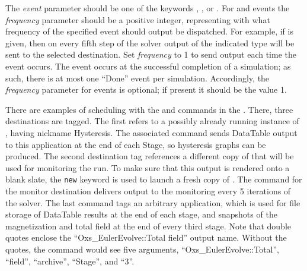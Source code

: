 \begin{description}
The \textit{event} parameter should be one of the keywords ,
, or .  For  and  events the
\textit{frequency} parameter should be a positive integer, representing
with what frequency of the specified event should output be dispatched.
For example, if  is given, then on every fifth step of the
solver output of the indicated type will be sent to the selected
destination.  Set \textit{frequency} to 1 to send output each time the
event occurs.  The  event occurs at the successful completion
of a simulation; as such, there is at most one ``Done'' event per
simulation.  Accordingly, the \textit{frequency} parameter for 
events is optional; if present it should be the value 1.

There are examples of scheduling with the  and
 commands in the .  There,
three destinations are tagged.  The first refers to a possibly already
running instance of , having nickname Hysteresis.  The
associated  command sends DataTable output to this
application at the end of each Stage, so hysteresis graphs can be
produced.  The second destination tag references a different copy of
 that will be used for monitoring the run.  To make sure
that this output is rendered onto a blank slate, the \texttt{new}
keyword is used to launch a fresh copy of .  The
 command for the monitor destination delivers output to
the monitoring  every 5 iterations of the solver.  The last
 command tags an arbitrary  application,
which is used for file storage of DataTable results at the end of each
stage, and snapshots of the magnetization and total field at the end of
every third stage.  Note that double quotes enclose the
``Oxs\_EulerEvolve::Total field'' output name.  Without the quotes, the
 command would see five arguments,
``Oxs\_EulerEvolve::Total'', ``field'', ``archive'', ``Stage'', and
``3''.
\end{description}

